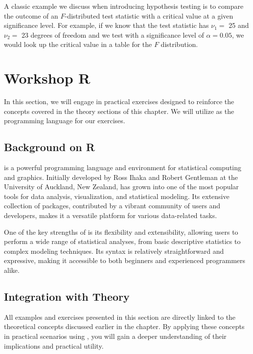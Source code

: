 A classic example we discuss when introducing hypothesis testing is to compare the outcome of an $F$-distributed test statistic with a critical value at a given significance level. For example, if we know that the test statistic has $\nu_1 = $ 25 and $\nu_2 = $ 23 degrees of freedom and we test with a significance level of $\alpha =  0.05$, we would look up the critical value in a table for the $F$ distribution.

\section{Workshop R} %
\label{sec:workshop02r}

In this section, we will engage in practical exercises designed to reinforce the concepts covered in the theory sections of this chapter. We will utilize  as the programming language for our exercises.

\subsection*{Background on R}

 is a powerful programming language and environment for statistical computing and graphics. Initially developed by Ross Ihaka and Robert Gentleman at the University of Auckland, New Zealand,  has grown into one of the most popular tools for data analysis, visualization, and statistical modeling. Its extensive collection of packages, contributed by a vibrant community of users and developers, makes it a versatile platform for various data-related tasks.

One of the key strengths of  is its flexibility and extensibility, allowing users to perform a wide range of statistical analyses, from basic descriptive statistics to complex modeling techniques. Its syntax is relatively straightforward and expressive, making it accessible to both beginners and experienced programmers alike.

\subsection*{Integration with Theory}

All examples and exercises presented in this section are directly linked to the theoretical concepts discussed earlier in the chapter. By applying these concepts in practical scenarios using , you will gain a deeper understanding of their implications and practical utility.

